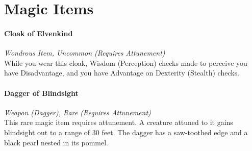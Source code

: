 \documentclass[letterpaper,openany,oneside,twocolumn]{book}
\begin{document}
\part*{Magic Items}
\subsection*{Cloak of Elvenkind}
\textit{Wondrous Item, Uncommon (Requires Attunement)}\\
{\entryfont While you wear this cloak, Wisdom (Perception) checks made to perceive you have Disadvantage, and you have Advantage on Dexterity (Stealth) checks.}
\subsection*{Dagger of Blindsight}
\textit{Weapon (Dagger), Rare (Requires Attunement)}\\
{\entryfont This rare magic item requires attunement. A creature attuned to it gains blindsight out to a range of 30 feet. The dagger has a saw-toothed edge and a black pearl nested in its pommel.}
\end{document}
